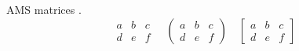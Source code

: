 \documentclass{article}
\begin{document}
AMS matrices .
\[
\begin{matrix}
a & b & c \\
d & e & f
\end{matrix}
\quad
\begin{pmatrix}
a & b & c \\
d & e & f
\end{pmatrix}
\quad
\begin{bmatrix}
a & b & c \\
d & e & f
\end{bmatrix}
\]
\end{document}
